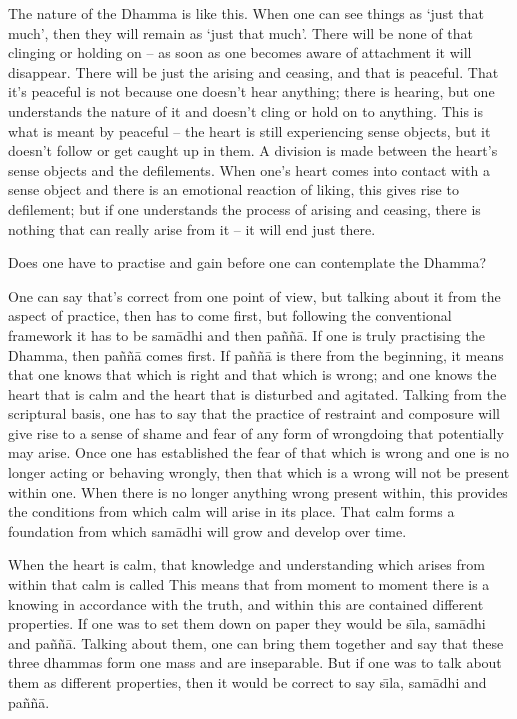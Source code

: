 The nature of the Dhamma is like this. When one can see things as `just that much', then they will remain as `just that much'. There will be none of that clinging or holding on -- as soon as one becomes aware of attachment it will disappear. There will be just the arising and ceasing, and that is peaceful. That it's peaceful is not because one doesn't hear anything; there is hearing, but one understands the nature of it and doesn't cling or hold on to anything. This is what is meant by peaceful -- the heart is still experiencing sense objects, but it doesn't follow or get caught up in them. A division is made between the heart's sense objects and the defilements. When one's heart comes into contact with a sense object and there is an emotional reaction of liking, this gives rise to defilement; but if one understands the process of arising and ceasing, there is nothing that can really arise from it -- it will end just there.  

 Does one have to practise and gain  before one can contemplate the Dhamma?  

 One can say that's correct from one point of view, but talking about it from the aspect of practice, then  has to come first, but following the conventional framework it has to be  sam\=adhi and then pa\~n\~n\=a. If one is truly practising the Dhamma, then pa\~n\~n\=a comes first. If pa\~n\~n\=a is there from the beginning, it means that one knows that which is right and that which is wrong; and one knows the heart that is calm and the heart that is disturbed and agitated. Talking from the scriptural basis, one has to say that the practice of restraint and composure will give rise to a sense of shame and fear of any form of wrongdoing that potentially may arise. Once one has established the fear of that which is wrong and one is no longer acting or behaving wrongly, then that which is a wrong will not be present within one. When there is no longer anything wrong present within, this provides the conditions from which calm will arise in its place. That calm forms a foundation from which sam\=adhi will grow and develop over time.

When the heart is calm, that knowledge and understanding which arises from within that calm is called  This means that from moment to moment there is a knowing in accordance with the truth, and within this are contained different properties. If one was to set them down on paper they would be s\={\i}la, sam\=adhi and pa\~n\~n\=a. Talking about them, one can bring them together and say that these three dhammas form one mass and are inseparable. But if one was to talk about them as different properties, then it would be correct to say s\={\i}la, sam\=adhi and pa\~n\~n\=a.

